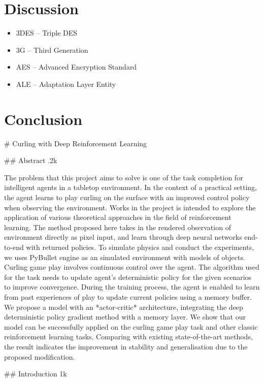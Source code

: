 \documentclass[twoside,12pt,a4paper]{article}
\begin{document}
\section{Discussion}
\begin{itemize}[nolistsep]
    \item 3DES -- Triple DES
    \item 3G -- Third Generation
    \item AES -- Advanced Encryption Standard
    \item ALE -- Adaptation Layer Entity
\end{itemize}


\section{Conclusion}
# Curling with Deep Reinforcement Learning



## Abstract .2k

The problem that this project aims to solve is one of the task completion for intelligent agents in a tabletop environment. In the context of a practical setting, the agent learns to play curling on the surface with an improved control policy when observing the environment. Works in the project is intended to explore the application of various theoretical approaches in the field of reinforcement learning. The method proposed here takes in the rendered observation of environment directly as pixel input, and learn through deep neural networks end-to-end with returned policies. To simulate physics and conduct the experiments, we uses PyBullet engine as an simulated environment with models of objects. Curling game play involves continuous control over the agent. The algorithm used for the task needs to update agent's deterministic policy for the given scenarios to improve convergence. During the training process, the agent is enabled to learn from past experiences of play to update current policies using a memory buffer. We propose a model with an *actor-critic* architecture, integrating the deep deterministic policy gradient method with a memory layer. We show that our model can be successfully applied on the curling game play task and other classic reinforcement learning tasks. Comparing with existing state-of-the-art methods, the result indicates the improvement in stability and generalisation due to the proposed modification.



## Introduction 1k
\end{document}
